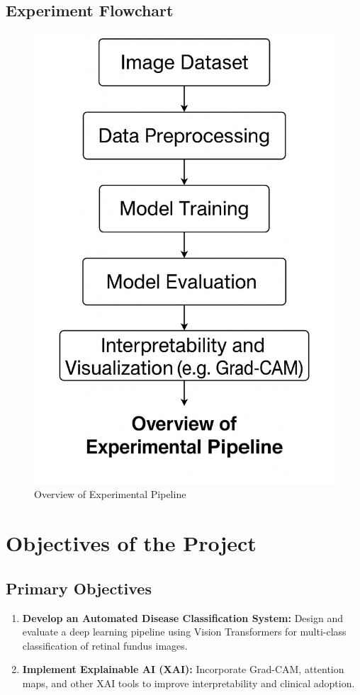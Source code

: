 \documentclass[a4paper,12pt]{report}
\begin{document}
\subsection{Experiment Flowchart}

\begin{figure}[h]
    \centering
    \includegraphics[width=\textwidth]{experiment flowchart.png}
    \caption{Overview of Experimental Pipeline}
    \label{fig:experiment_flowchart}
\end{figure}

\section{Objectives of the Project}

\subsection{Primary Objectives}
\begin{enumerate}
    \item \textbf{Develop an Automated Disease Classification System:} Design and evaluate a deep learning pipeline using Vision Transformers for multi-class classification of retinal fundus images.
    \item \textbf{Implement Explainable AI (XAI):} Incorporate Grad-CAM, attention maps, and other XAI tools to improve interpretability and clinical adoption.
\end{enumerate}
\end{document}
